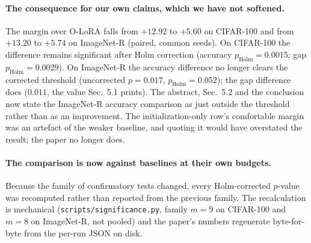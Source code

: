 \paragraph{The consequence for our own claims, which we have not softened.} The margin over
O-LoRA falls from $+12.92$ to $+5.60$ on CIFAR-100 and from $+13.20$ to $+5.74$ on
ImageNet-R (paired, common seeds). On CIFAR-100 the difference remains significant after
Holm correction (accuracy $p_{\mathrm{Holm}}{=}0.0015$; gap $p_{\mathrm{Holm}}{=}0.0029$). On
ImageNet-R the accuracy difference no longer clears the corrected threshold (uncorrected
$p{=}0.017$, $p_{\mathrm{Holm}}{=}0.052$); the gap difference does ($0.011$, the value
Sec.~5.1 prints). The abstract,
Sec.~5.2 and the conclusion now state the ImageNet-R accuracy comparison as
just outside the threshold rather than as an improvement. The initialization-only row's
comfortable margin was an artefact of the weaker baseline, and quoting it would have
overstated the result; the paper no longer does.

\paragraph{The comparison is now against baselines at their own budgets.} Because the family
of confirmatory tests changed, every Holm-corrected $p$-value was recomputed rather than
reported from the previous family. The recalculation is mechanical
(\texttt{scripts/significance.py}, family $m{=}9$ on CIFAR-100 and $m{=}8$ on ImageNet-R, not
pooled) and the paper's numbers regenerate byte-for-byte from the per-run JSON on disk.

